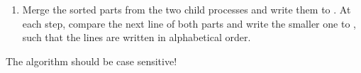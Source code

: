 \begin{enumerate}
\item Merge the sorted parts from the two child processes
and write them to .
At each step, compare the next line of both parts
and write the smaller one to ,
such that the lines are written in alphabetical order.

\end{enumerate}

The algorithm should be case sensitive!


